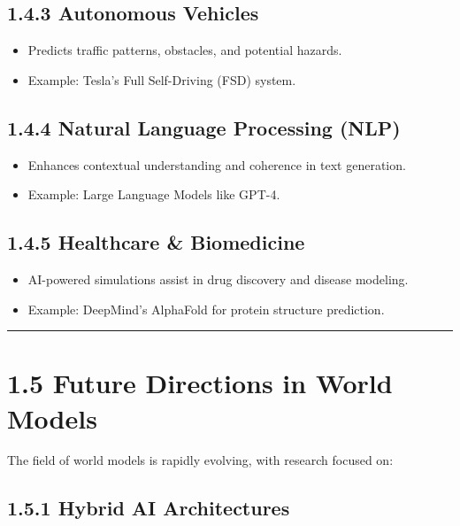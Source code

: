 \documentclass[
]{book}
\providecommand{\tightlist}{%
  \setlength{\itemsep}{0pt}\setlength{\parskip}{0pt}}
\begin{document}
\subsection{1.4.3 Autonomous Vehicles}\label{autonomous-vehicles}

\begin{itemize}
\tightlist
\item
  Predicts traffic patterns, obstacles, and potential hazards.
\item
  Example: Tesla's Full Self-Driving (FSD) system.
\end{itemize}

\subsection{1.4.4 Natural Language Processing (NLP)}\label{natural-language-processing-nlp}

\begin{itemize}
\tightlist
\item
  Enhances contextual understanding and coherence in text generation.
\item
  Example: Large Language Models like GPT-4.
\end{itemize}

\subsection{1.4.5 Healthcare \& Biomedicine}\label{healthcare-biomedicine}

\begin{itemize}
\tightlist
\item
  AI-powered simulations assist in drug discovery and disease modeling.
\item
  Example: DeepMind's AlphaFold for protein structure prediction.
\end{itemize}

\begin{center}\rule{0.5\linewidth}{0.5pt}\end{center}

\section{1.5 Future Directions in World Models}\label{future-directions-in-world-models}

The field of world models is rapidly evolving, with research focused on:

\subsection{1.5.1 Hybrid AI Architectures}\label{hybrid-ai-architectures}
\end{document}
